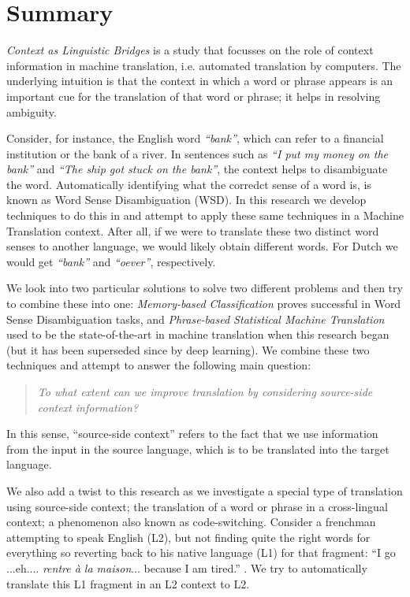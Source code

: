 \chapter*{Summary}

\emph{Context as Linguistic Bridges} is a study that focusses on the role of
context information in machine translation, i.e. automated translation by computers.  The
underlying intuition is that the context in which a word or phrase appears is
an important cue for the translation of that word or phrase; it helps in
resolving ambiguity.

Consider, for instance, the English word \emph{``bank''}, which can refer to a
financial institution or the bank of a river. In sentences such as \emph{``I
put my money on the bank''} and \emph{``The ship got stuck on the bank''}, the
context helps to disambiguate the word. Automatically identifying what the corredct sense of a word is, is known as Word Sense
Disambiguation (WSD). In this research we develop techniques to do this
in and attempt to apply these same techniques in a Machine
Translation context. After all, if we were to translate these two distinct
word senses to another language, we would likely obtain different words. For
Dutch we would get \emph{``bank''} and \emph{``oever''}, respectively.

We look into two particular solutions to solve two different problems and then
try to combine these into one: \emph{Memory-based Classification} proves
successful in Word Sense Disambiguation tasks, and \emph{Phrase-based
Statistical Machine Translation} used to be the state-of-the-art in machine
translation when this research began (but it has been superseded since by deep
learning). We combine these two techniques and attempt to answer the following main
question:

\begin{quote}
\emph{To what extent can we improve translation by considering source-side context information?}
\end{quote}

In this sense, ``source-side context'' refers to the fact that we use
information from the input in the source language, which is to be translated
into the target language.

We also add a twist to this research as we investigate a special type of
translation using source-side context; the translation of a word or phrase in a
cross-lingual context; a phenomenon also known as code-switching. Consider a
frenchman attempting to speak English (L2), but not finding quite the right
words for everything so reverting back to his native language (L1) for that
fragment: ``I go ...eh.... \emph{rentre à la maison}... because I am tired.''
. We try to automatically translate this L1 fragment in an L2 context to L2.

